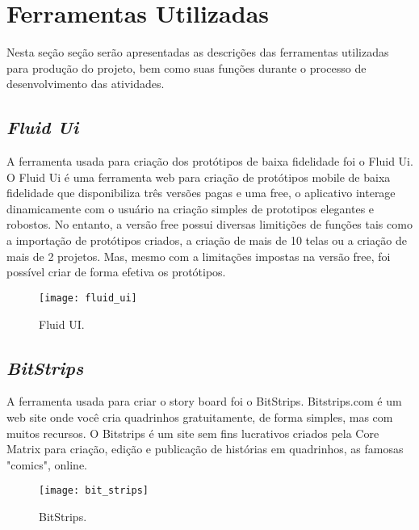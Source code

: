 \chapter[Ferramentas Utilizadas]{Ferramentas Utilizadas}
\label{chap:ferramentas}
	
	Nesta seção seção serão apresentadas as descrições das ferramentas utilizadas para produção do projeto, bem como suas funções durante o processo de desenvolvimento das atividades.

	\section[Fluid Ui]{\emph{Fluid Ui}}
	\label{sec:ferramentas_fluidUI}

		A ferramenta usada para criação dos protótipos de baixa fidelidade foi o Fluid Ui. O Fluid Ui é uma ferramenta web para criação de protótipos mobile de baixa fidelidade que disponibiliza três versões pagas e uma free, o aplicativo interage dinamicamente com o usuário na criação simples de prototipos elegantes e robostos. No entanto, a versão free possui diversas limitições de funções tais como a importação de protótipos criados, a criação de mais de 10 telas ou a criação de mais de 2 projetos. Mas, mesmo com a limitações impostas na versão free, foi possível criar de forma efetiva os protótipos. \cite{fluid}

		\begin{figure}[h]
			\centering
			\texttt{[image: fluid\_ui]}
			\caption[Fluid UI]{Fluid UI.}
			\label{fig:fluid_ui}
		\end{figure}

	\section[BitStrips]{\emph{BitStrips}}
	\label{sec:ferramentas_bitStrips}

		A ferramenta usada para criar o story board foi o BitStrips. Bitstrips.com é um web site onde você cria quadrinhos gratuitamente, de forma simples, mas com muitos recursos. O Bitstrips é um site sem fins lucrativos criados pela Core Matrix para criação, edição e publicação de histórias em quadrinhos, as famosas "comics", online. \cite{bit}

		\begin{figure}[h]
			\centering
			\texttt{[image: bit\_strips]}
			\caption[BitStrips]{BitStrips.}
			\label{fig:bit_strips}
		\end{figure}

